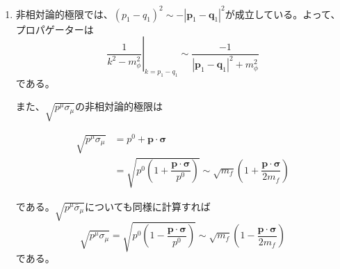 \documentclass[unicode,a4paper,10pt]{ltjsarticle}
\begin{document}
\begin{enumerate}
  \item
        非相対論的極限では、$(p_{1}-q_{1})^2\sim -|\bm{p}_{1}-\bm{q}_{1}|^2$が成立している。よって、プロパゲーターは
        \begin{equation}
          \left.\dfrac{1}{k^2-m_{\phi}^2}\right|_{k=p_{1}-q_{1}}
          \sim
          \dfrac{-1}{|\bm{p}_{1}-\bm{q}_{1}|^2+m_{\phi}^2}
          \label{eqn:propag}
        \end{equation}
        である。

        また、$\sqrt{p^{\mu}\sigma_{\mu}}$の非相対論的極限は
        \begin{graybox}

          \vspace*{-10pt}

          \begin{align}
            \sqrt{p^{\mu}\sigma_{\mu}}
             & =
            p^{0}
            +
            \bm{p}\cdot\bm{\sigma}
            \nonumber
            \\
             & =
            \sqrt{
              p^{0}
              \left(
              1+\dfrac{\bm{p}\cdot\bm{\sigma}}{p^{0}}
              \right)
            }
            \sim
            \sqrt{m_{f}}\left( 1+\dfrac{\bm{p}\cdot\bm{\sigma}}{2m_{f}} \right)
          \end{align}
        \end{graybox}
        である。$\sqrt{p^{\mu}\bar{\sigma}_{\mu}}$についても同様に計算すれば
        \begin{equation}
          \sqrt{p^{\mu}\sigma_{\mu}}
          =
          \sqrt{
            p^{0}
            \left(
            1-\dfrac{\bm{p}\cdot\bm{\sigma}}{p^{0}}
            \right)
          }
          \sim
          \sqrt{m_{f}}\left( 1-\dfrac{\bm{p}\cdot\bm{\sigma}}{2m_{f}} \right)
        \end{equation}
        である。


\end{enumerate}
\end{document}
